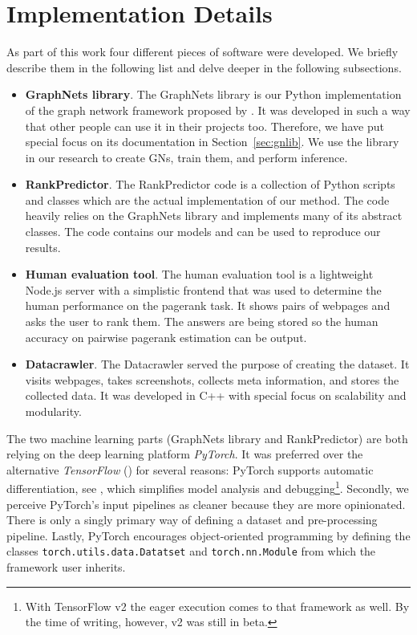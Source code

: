 \section{Implementation Details}
\label{sec:implementationdetails}

As part of this work four different pieces of software were developed. We briefly describe them in the following list and delve deeper in the following subsections.

\begin{itemize}
    \item \textbf{GraphNets library}. The GraphNets library is our Python implementation of the graph network framework proposed by \cite{deepmind:graphnets}. It was developed in such a way that other people can use it in their projects too. Therefore, we have put special focus on its documentation in Section~\ref{sec:gnlib}. We use the library in our research to create GNs, train them, and perform inference.
    \item \textbf{RankPredictor}. The RankPredictor code is a collection of Python scripts and classes which are the actual implementation of our method. The code heavily relies on the GraphNets library and implements many of its abstract classes. The code contains our models and can be used to reproduce our results.
    \item \textbf{Human evaluation tool}. The human evaluation tool is a lightweight Node.js server with a simplistic frontend that was used to determine the human performance on the pagerank task. It shows pairs of webpages and asks the user to rank them. The answers are being stored so the human accuracy on pairwise pagerank estimation can be output.
    \item \textbf{Datacrawler}. The Datacrawler served the purpose of creating the dataset. It visits webpages, takes screenshots, collects meta information, and stores the collected data. It was developed in C++ with special focus on scalability and modularity.
\end{itemize}

The two machine learning parts (GraphNets library and RankPredictor) are both relying on the deep learning platform \textit{PyTorch}. It was preferred over the alternative \textit{TensorFlow} (\cite{abadi2016:tensorflow}) for several reasons: PyTorch supports automatic differentiation, see \cite{paszke2017automatic:pytorch}, which simplifies model analysis and debugging\footnote{With TensorFlow v2 the eager execution comes to that framework as well. By the time of writing, however, v2 was still in beta.}. Secondly, we perceive PyTorch's input pipelines as cleaner because they are more opinionated. There is only a singly primary way of defining a dataset and pre-processing pipeline. Lastly, PyTorch encourages object-oriented programming by defining the classes \texttt{torch.utils.data.Datatset} and \texttt{torch.nn.Module} from which the framework user inherits.





